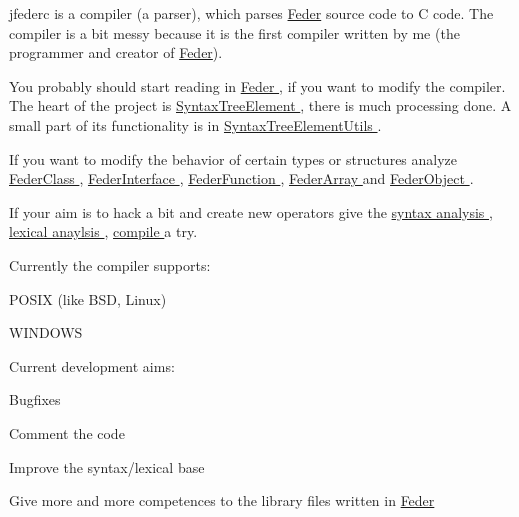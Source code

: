jfederc is a compiler (a parser), which parses \hyperlink{classfeder_1_1Feder}{Feder} source code to C code. The compiler is a bit messy because it is the first compiler written by me (the programmer and creator of \hyperlink{classfeder_1_1Feder}{Feder}).

You probably should start reading in \hyperlink{classfeder_1_1Feder}{Feder }, if you want to modify the compiler. The \textquotesingle{}heart\textquotesingle{} of the project is \hyperlink{classfeder_1_1SyntaxTreeElement}{Syntax\+Tree\+Element }, there is much processing done. A small part of its functionality is in \hyperlink{classfeder_1_1SyntaxTreeElementUtils}{Syntax\+Tree\+Element\+Utils }.

If you want to modify the behavior of certain types or structures analyze \hyperlink{}{Feder\+Class }, \hyperlink{}{Feder\+Interface }, \hyperlink{}{Feder\+Function }, \hyperlink{}{Feder\+Array } and \hyperlink{}{Feder\+Object }.

If your aim is to hack a bit and create new operators give the \hyperlink{classfeder_1_1Syntax}{syntax analysis }, \hyperlink{classfeder_1_1Lexer}{lexical anaylsis }, \hyperlink{classfeder_1_1SyntaxTreeElement_ad0ea3bbe00ba7d3598fce939efef67de}{compile } a try.

Currently the compiler supports\+:


\begin{DoxyItemize}
\item P\+O\+S\+IX (like B\+SD, Linux)
\item W\+I\+N\+D\+O\+WS
\end{DoxyItemize}

Current development aims\+:


\begin{DoxyItemize}
\item Bugfixes
\item Comment the code
\item Improve the syntax/lexical base
\item Give more and more competences to the library files written in \hyperlink{classfeder_1_1Feder}{Feder} 
\end{DoxyItemize}